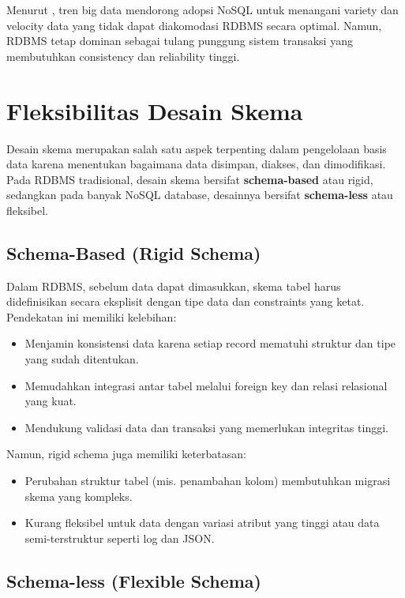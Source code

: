 Menurut \cite{gandomi2015}, tren big data mendorong adopsi NoSQL untuk menangani variety dan velocity data yang tidak dapat diakomodasi RDBMS secara optimal. Namun, RDBMS tetap dominan sebagai tulang punggung sistem transaksi yang membutuhkan consistency dan reliability tinggi.


\section{Fleksibilitas Desain Skema}

Desain skema merupakan salah satu aspek terpenting dalam pengelolaan basis data karena menentukan bagaimana data disimpan, diakses, dan dimodifikasi. Pada RDBMS tradisional, desain skema bersifat \textbf{schema-based} atau rigid, sedangkan pada banyak NoSQL database, desainnya bersifat \textbf{schema-less} atau fleksibel.

\subsection{Schema-Based (Rigid Schema)}

Dalam RDBMS, sebelum data dapat dimasukkan, skema tabel harus didefinisikan secara eksplisit dengan tipe data dan constraints yang ketat. Pendekatan ini memiliki kelebihan:
\begin{itemize}
	\item Menjamin konsistensi data karena setiap record mematuhi struktur dan tipe yang sudah ditentukan.
	\item Memudahkan integrasi antar tabel melalui foreign key dan relasi relasional yang kuat.
	\item Mendukung validasi data dan transaksi yang memerlukan integritas tinggi.
\end{itemize}

Namun, rigid schema juga memiliki keterbatasan:
\begin{itemize}
	\item Perubahan struktur tabel (mis. penambahan kolom) membutuhkan migrasi skema yang kompleks.
	\item Kurang fleksibel untuk data dengan variasi atribut yang tinggi atau data semi-terstruktur seperti log dan JSON.
\end{itemize}

\subsection{Schema-less (Flexible Schema)}

